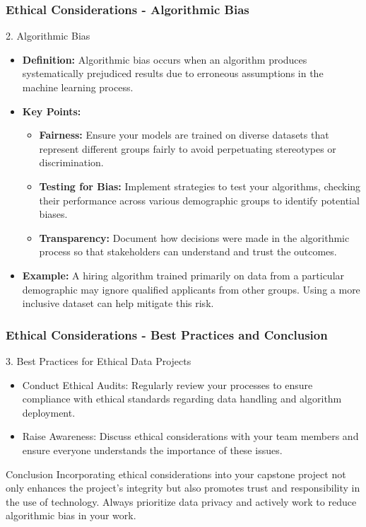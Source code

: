 \documentclass[aspectratio=169]{beamer}
\begin{document}
\begin{frame}[fragile]
    \frametitle{Ethical Considerations - Algorithmic Bias}
    \begin{block}{2. Algorithmic Bias}
        \begin{itemize}
            \item \textbf{Definition:} Algorithmic bias occurs when an algorithm produces systematically prejudiced results due to erroneous assumptions in the machine learning process.
            \item \textbf{Key Points:}
            \begin{itemize}
                \item \textbf{Fairness:} Ensure your models are trained on diverse datasets that represent different groups fairly to avoid perpetuating stereotypes or discrimination.
                \item \textbf{Testing for Bias:} Implement strategies to test your algorithms, checking their performance across various demographic groups to identify potential biases.
                \item \textbf{Transparency:} Document how decisions were made in the algorithmic process so that stakeholders can understand and trust the outcomes.
            \end{itemize}
            \item \textbf{Example:} A hiring algorithm trained primarily on data from a particular demographic may ignore qualified applicants from other groups. Using a more inclusive dataset can help mitigate this risk.
        \end{itemize}
    \end{block}
\end{frame}

\begin{frame}[fragile]
    \frametitle{Ethical Considerations - Best Practices and Conclusion}
    \begin{block}{3. Best Practices for Ethical Data Projects}
        \begin{itemize}
            \item Conduct Ethical Audits: Regularly review your processes to ensure compliance with ethical standards regarding data handling and algorithm deployment.
            \item Raise Awareness: Discuss ethical considerations with your team members and ensure everyone understands the importance of these issues.
        \end{itemize}
    \end{block}
    
    \begin{block}{Conclusion}
        Incorporating ethical considerations into your capstone project not only enhances the project's integrity but also promotes trust and responsibility in the use of technology. 
        Always prioritize data privacy and actively work to reduce algorithmic bias in your work.
    \end{block}
\end{frame}
\end{document}
